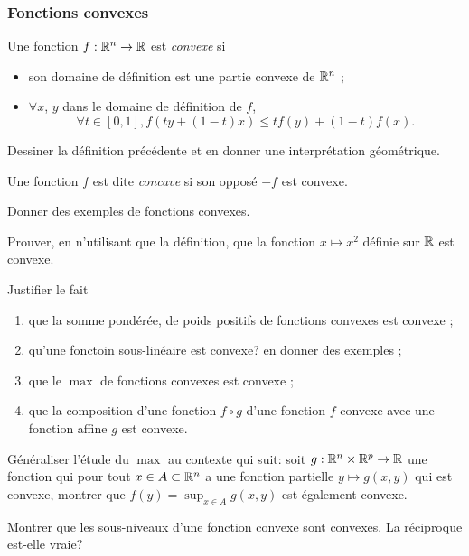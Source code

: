 \documentclass[11pt, a4paper]{article}
\begin{document}
\subsubsection{Fonctions convexes}
\label{sec:fonctionsconvexe}

\begin{defn}
  Une fonction $f : \mathbb{R}^n \to \mathbb{R}$ est \emph{convexe} si
  \begin{itemize}
  \item son domaine de définition est une partie convexe de $\mathbb{R}^n$ ;
  \item $\forall x$, $y$ dans le domaine de définition de $f$,
    \[
      \forall t \in [0, 1], f(ty + (1-t)x) \leq tf(y) + (1-t)f(x).
    \]
  \end{itemize}
\end{defn}
\begin{question}
  Dessiner la définition précédente et en donner une interprétation
  géométrique.
\end{question}
\begin{defn}
  Une fonction $f$ est dite \emph{concave} si son opposé $-f$ est
  convexe.
\end{defn}
\begin{question}
  Donner des exemples de fonctions convexes.
\end{question}
\begin{question}
  Prouver, en n'utilisant que la définition, que la fonction
  $x \mapsto x^2$ définie sur $\mathbb{R}$ est convexe.
\end{question}
\begin{question}
  Justifier le fait
  \begin{enumerate}
  \item que la somme pondérée, de poids positifs de fonctions convexes est convexe ;
  \item qu'une fonctoin sous-linéaire est convexe? en donner des exemples ;
  \item que le $\max$ de fonctions convexes est convexe ;
  \item que la composition d'une fonction $f \circ g$ d'une fonction
    $f$ convexe avec une fonction affine $g$ est convexe.
  \end{enumerate}
\end{question}
\begin{question}
  Généraliser l'étude du $\max$ au contexte qui suit: soit
  $g : \mathbb{R}^n \times \mathbb{R}^p \to \mathbb{R}$ une fonction qui pour tout
  $x \in A \subset \mathbb{R}^n$ a une fonction partielle $y \mapsto g(x, y)$
  qui est convexe, montrer que $f(y) = \sup_{x \in A} g(x, y)$ est
  également convexe.
\end{question}
\begin{question}
  Montrer que les sous-niveaux d'une fonction convexe sont
  convexes. La réciproque est-elle vraie?
\end{question}
\end{document}

